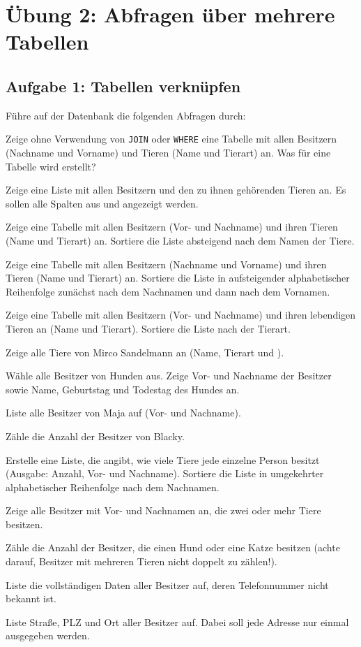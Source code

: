 \clearpage

\section{Übung 2: Abfragen über mehrere Tabellen}

\subsection{Aufgabe 1: Tabellen verknüpfen}

Führe auf der Datenbank  die folgenden Abfragen durch:

\begin{compactenum}[a)]
\item Zeige ohne Verwendung von \lstinline|JOIN| oder \lstinline|WHERE| eine
Tabelle mit allen Besitzern (Nachname und Vorname) und Tieren (Name und
Tierart) an. Was für eine Tabelle wird erstellt?
\item Zeige eine Liste mit allen Besitzern und den zu ihnen gehörenden Tieren
an. Es sollen alle Spalten aus  und 
angezeigt werden.
\item Zeige eine Tabelle mit allen Besitzern (Vor- und Nachname) und ihren
Tieren (Name und Tierart) an. Sortiere die Liste absteigend nach dem Namen der
Tiere.
\item Zeige eine Tabelle mit allen Besitzern (Nachname und Vorname) und ihren
Tieren (Name und Tierart) an. Sortiere die Liste in aufsteigender
alphabetischer Reihenfolge zunächst nach dem Nachnamen und dann nach dem
Vornamen.
\item Zeige eine Tabelle mit allen Besitzern (Vor- und Nachname) und ihren
lebendigen Tieren an (Name und Tierart). Sortiere die Liste nach der Tierart.
\item Zeige alle Tiere von Mirco Sandelmann an (Name, Tierart und
).
\item Wähle alle Besitzer von Hunden aus. Zeige Vor- und Nachname der Besitzer
sowie Name, Geburtstag und Todestag des Hundes an.
\item Liste alle Besitzer von Maja auf (Vor- und Nachname).
\item Zähle die Anzahl der Besitzer von Blacky.
\item Erstelle eine Liste, die angibt, wie viele Tiere jede einzelne Person
besitzt (Ausgabe: Anzahl, Vor- und Nachname). Sortiere die Liste in
umgekehrter alphabetischer Reihenfolge nach dem Nachnamen.
\item Zeige alle Besitzer mit Vor- und Nachnamen an, die zwei oder mehr Tiere
besitzen.
\item Zähle die Anzahl der Besitzer, die einen Hund oder eine Katze besitzen
(achte darauf, Besitzer mit mehreren Tieren nicht doppelt zu zählen!).
\item Liste die vollständigen Daten aller Besitzer auf, deren Telefonnummer
nicht bekannt ist.
\item Liste Straße, PLZ und Ort aller Besitzer auf. Dabei soll jede Adresse nur
einmal ausgegeben werden.
\end{compactenum}

